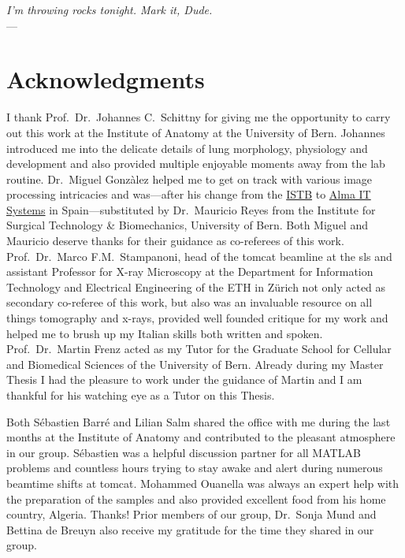 
\begin{flushright}{\slshape I'm throwing rocks tonight. Mark it, Dude.} \\ \medskip
    ---  \citep{TheBigLebowski}
\end{flushright}

\bigskip
\begingroup
\let\clearpage\relax
\let\cleardoublepage\relax
\let\cleardoublepage\relax
\chapter*{Acknowledgments}
I thank Prof.\ Dr.\ Johannes C.\ Schittny for giving me the opportunity to carry out this work at the Institute of Anatomy at the University of Bern. Johannes introduced me into the delicate details of lung morphology, physiology and development and also provided multiple enjoyable moments away from the lab routine. Dr.\ Miguel Gonzàlez helped me to get on track with various image processing intricacies and was---after his  change from the \href{http://www.istb.unibe.ch/}{ISTB} to \href{http://www.alma3d.com/en}{Alma IT Systems} in Spain---substituted by Dr.\ Mauricio Reyes from the Institute for Surgical Technology \& Biomechanics, University of Bern. Both Miguel and Mauricio deserve thanks for their guidance as co-referees of this work. Prof.\ Dr.\ Marco F.M.\ Stampanoni, head of the \acs{tomcat} beamline at the \acl{sls} and assistant Professor for X-ray Microscopy at the Department for Information Technology and Electrical Engineering of the ETH in Zürich not only acted as secondary co-referee of this work, but also was an invaluable resource on all things tomography and x-rays, provided well founded critique for my work and helped me to brush up my Italian skills both written and spoken. Prof.\ Dr.\ Martin Frenz acted as my Tutor for the Graduate School for Cellular and Biomedical Sciences of the University of Bern. Already during my Master Thesis I had the pleasure to work under the guidance of  Martin and I am thankful for his watching eye as a Tutor on this Thesis.

Both Sébastien Barré and Lilian Salm shared the office with me during the last months at the Institute of Anatomy and contributed to the pleasant atmosphere in our group. Sébastien was a helpful discussion partner for all MATLAB problems and countless hours trying to stay awake and alert during numerous beamtime shifts at \acs{tomcat}. Mohammed Ouanella was always an expert help with the preparation of the samples and also provided excellent food from his home country, Algeria. Thanks! Prior members of our group, Dr.\ Sonja Mund and Bettina de Breuyn also receive my gratitude for the time they shared in our group.


